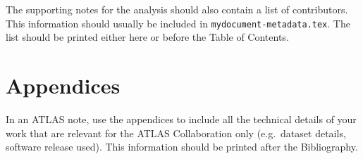 \documentclass[NOTE, atlasdraft=true, texlive=2016, UKenglish]{\ATLASLATEXPATH atlasdoc}
\begin{document}
\maketitle

\tableofcontents

\clearpage


\clearpage


\clearpage

\clearpage

\clearpage

\clearpage

\clearpage

\clearpage

\clearpage

\clearpage

\clearpage

\clearpage

\printbibliography
% 
% 

\clearpage
The supporting notes for the analysis should also contain a list of contributors.
This information should usually be included in \texttt{mydocument-metadata.tex}.
The list should be printed either here or before the Table of Contents.


\clearpage
\appendix
\part*{Appendices}







In an ATLAS note, use the appendices to include all the technical details of your work
that are relevant for the ATLAS Collaboration only (e.g.\ dataset details, software release used).
This information should be printed after the Bibliography.
\end{document}

